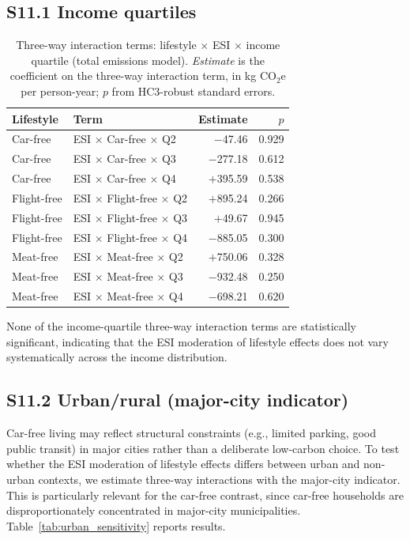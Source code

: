 \documentclass[12pt]{article}
\begin{document}
\subsection*{S11.1 Income quartiles}

\begin{table}[!htbp]
\centering
\small
\caption{Three-way interaction terms: lifestyle $\times$ ESI $\times$ income quartile (total emissions model). \textit{Estimate} is the coefficient on the three-way interaction term, in kg CO$_2$e per person-year; $p$ from HC3-robust standard errors.}
\label{tab:income_sensitivity}
\begin{tabular}{llrr}
\toprule
\textbf{Lifestyle} & \textbf{Term} & \textbf{Estimate} & \textbf{$p$} \\
\midrule
Car-free & ESI $\times$ Car-free $\times$ Q2 & $-$47.46 & 0.929 \\
Car-free & ESI $\times$ Car-free $\times$ Q3 & $-$277.18 & 0.612 \\
Car-free & ESI $\times$ Car-free $\times$ Q4 & $+$395.59 & 0.538 \\
Flight-free & ESI $\times$ Flight-free $\times$ Q2 & $+$895.24 & 0.266 \\
Flight-free & ESI $\times$ Flight-free $\times$ Q3 & $+$49.67 & 0.945 \\
Flight-free & ESI $\times$ Flight-free $\times$ Q4 & $-$885.05 & 0.300 \\
Meat-free & ESI $\times$ Meat-free $\times$ Q2 & $+$750.06 & 0.328 \\
Meat-free & ESI $\times$ Meat-free $\times$ Q3 & $-$932.48 & 0.250 \\
Meat-free & ESI $\times$ Meat-free $\times$ Q4 & $-$698.21 & 0.620 \\
\bottomrule
\end{tabular}
\end{table}

None of the income-quartile three-way interaction terms are statistically significant, indicating that the ESI moderation of lifestyle effects does not vary systematically across the income distribution.

\subsection*{S11.2 Urban/rural (major-city indicator)}
Car-free living may reflect structural constraints (e.g., limited parking, good public transit) in major cities rather than a deliberate low-carbon choice. To test whether the ESI moderation of lifestyle effects differs between urban and non-urban contexts, we estimate three-way interactions with the major-city indicator. %
This is particularly relevant for the car-free contrast, since car-free households are disproportionately concentrated in major-city municipalities. Table~\ref{tab:urban_sensitivity} reports results.
\end{document}

